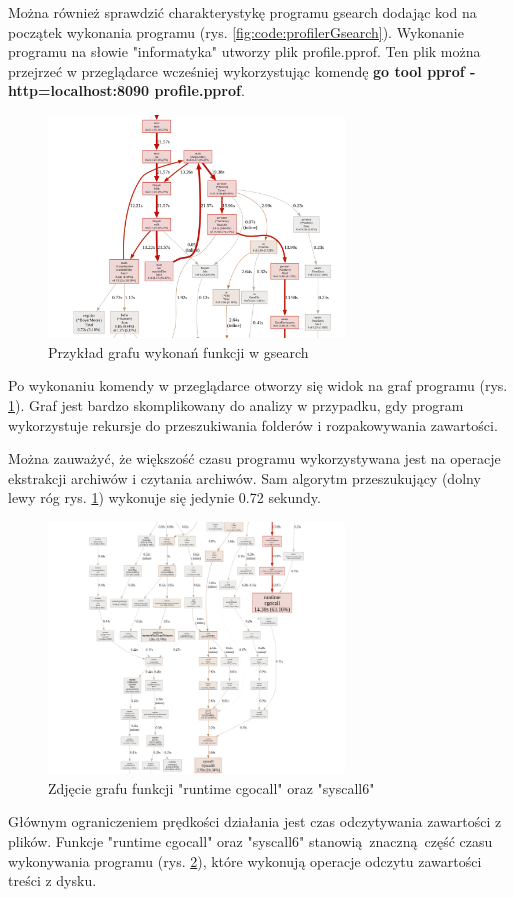 Można również sprawdzić charakterystykę programu gsearch dodając kod na początek 
wykonania programu (rys. \ref{fig:code:profilerGsearch}). Wykonanie programu na
słowie "informatyka" utworzy plik profile.pprof. Ten plik można przejrzeć w 
przeglądarce wcześniej wykorzystując komendę \textbf{go tool pprof -http=localhost:8090 profile.pprof}.

\begin{figure}[h]
\centering
\includegraphics[width=0.7\textwidth]{./images/profiler1.png}
\caption{Przykład grafu wykonań funkcji w gsearch}
\label{fig:profilerGsearch1}
\end{figure}

Po wykonaniu komendy w przeglądarce otworzy się widok na graf programu (rys. \ref{fig:profilerGsearch1}).
Graf jest bardzo skomplikowany do analizy w przypadku, gdy program wykorzystuje rekursje do
przeszukiwania folderów i rozpakowywania zawartości.

Można zauważyć, że większość czasu programu wykorzystywana jest na operacje 
ekstrakcji archiwów i czytania archiwów. Sam algorytm przeszukujący (dolny lewy 
róg rys. \ref{fig:profilerGsearch1}) wykonuje się jedynie 0.72 sekundy.

\begin{figure}[h]
\centering
\includegraphics[width=0.7\textwidth]{./images/profiler2.png}
\caption{Zdjęcie grafu funkcji "runtime cgocall" oraz "syscall6"}
\label{fig:profilerGsearch2}
\end{figure}

Głównym ograniczeniem prędkości działania jest czas odczytywania zawartości z plików.
Funkcje "runtime cgocall" oraz "syscall6" stanowią znaczną część czasu
wykonywania programu (rys. \ref{fig:profilerGsearch2}), które wykonują operacje
odczytu zawartości treści z dysku.